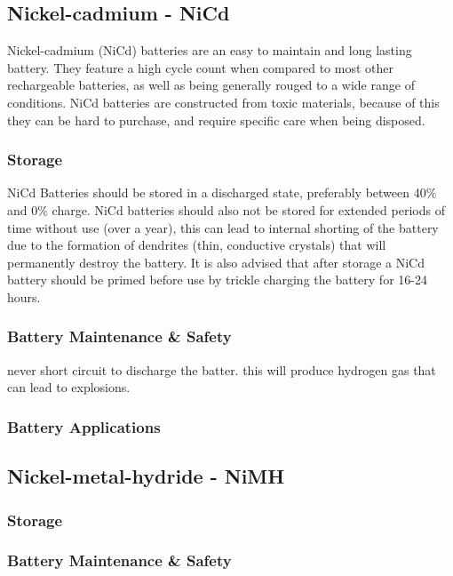 \documentclass[a4paper,11pt, twocolumn]{article}
\begin{document}
\subsection{Nickel-cadmium - NiCd}

Nickel-cadmium (NiCd) batteries are an easy to maintain and long lasting battery. They feature a high cycle count when compared to most other rechargeable batteries, as well as being generally rouged to a wide range of conditions. NiCd batteries are constructed from toxic materials, because of this they can be hard to purchase, and require specific care when being disposed.

\subsubsection{Storage}

NiCd Batteries should be stored in a discharged state, preferably between 40\% and 0\% charge. NiCd batteries should also not be stored for extended periods of time without use (over a year), this can lead to internal shorting of the battery due to the formation of dendrites (thin, conductive crystals) that will permanently destroy the battery\cite{dendrites}. It is also advised that after storage a NiCd battery should be primed before use by trickle charging the battery for 16-24 hours.

\subsubsection{Battery Maintenance \& Safety}

never short circuit to discharge the batter. this will produce hydrogen gas that can lead to explosions.

\subsubsection{Battery Applications}


\subsection{Nickel-metal-hydride - NiMH}

\subsubsection{Storage}

\subsubsection{Battery Maintenance \& Safety}
\end{document}
